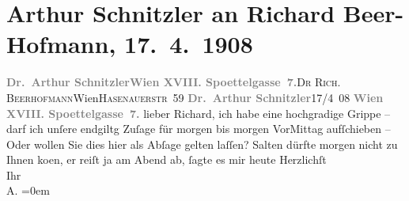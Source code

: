 

               \section[Arthur Schnitzler an Richard Beer-Hofmann, 17. 4. 1908]{ Arthur Schnitzler an Richard Beer-Hofmann, 17. 4. 1908}\nopagebreak{}\rehead{ }\begin{ledgroupsized}[t]{13cm}\normalsize\beginnumbering{} \toendnotes[C]{\smallbreak\pagebreak[2]} 
\toendnotes[C]{\smallbreak}\pstart{}{\pb}\textcolor{gray}{\textbf{Dr. Arthur Schnitzler}}\pend{}\pstart{}\textcolor{gray}{\textbf{Wien XVIII. Spoettelgasse 7.}}\pend{}{\bigskip}\pstart{}{\pb}\textsc{Dr Rich. Beerhofmann}\pend{}\pstart{}Wien\pend{}\pstart{}\textsc{Hasenauerstr 59}\pend{}{\bigskip}\pstart
           \noindent{}{\pb}\textcolor{gray}{\textbf{Dr. Arthur Schnitzler}}\hfill 17/4 08\pend
           \pstart
           \textcolor{gray}{\textbf{Wien XVIII. Spoettelgasse 7.}}\pend
           \pstart{}lieber Richard,\pend\pstart
           ich habe eine hochgradige Grippe – darf ich unſere endgiltg Zuſage für morgen \label{K_L01765_1v}\label{K_L01765_1h} bis morgen \introOben{}Vor\introOben{}Mittag aufſchieben – Oder {\pb}wollen Sie dies hier als Abſage gelten laſſen?\pend
           \pstart
           Salten dürfte morgen nicht zu Ihnen ko{\geminationm}en, er reiſt ja {\pb}am
                  Abend ab, ſagte es mir heute\pend
           \pstart
           Herzlichſt{\\[\baselineskip]}Ihr{\\[\baselineskip]}\spacefill\mbox{A.}\pend
           \leftskip=0em{}\endnumbering{}\end{ledgroupsized}  \newcommand{\dateiname}{L01765}\newcommand{\titel}{Arthur Schnitzler an Richard Beer-Hofmann, 17. 4. 1908}\newcommand{\editorInnen}{Martin Anton Müller und Gerd-Hermann Susen}
            \footnotesize
\begin{ledgroupsized}[t]{11.5cm}
\end{ledgroupsized}
         
      